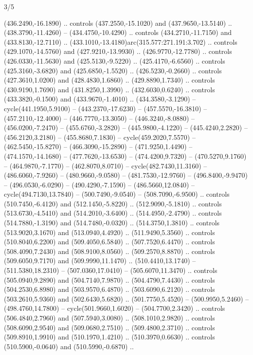 \begin{flagdescription}{3/5}
\begin{scope} [xshift=0.5\flagwidth*\stretchfactor,yshift=0.5\flagwidth,scale=\flagwidth/391]
\begin{scope}[y=0.8pt, x=0.8pt, yscale=-1, xscale=1,line width=0.01\lw,shift={(-98.875,-338.125)}]
\begin{scope}[cm={{0.15382,0.0,0.0,0.15382,(34.72393,273.11413)}}]
  (436.2490,-16.1890) .. controls (437.2550,-15.1020) and (437.9650,-13.5140) ..
  (438.3790,-11.4260) -- (434.4750,-10.4290) .. controls (434.2710,-11.7150) and
  (433.8130,-12.7110) .. (433.1010,-13.4180)arc(315.577:271.191:3.702) ..
  controls (429.1070,-14.5760) and (427.9210,-13.9930) .. (426.9770,-12.7780) ..
  controls (426.0330,-11.5630) and (425.5130,-9.5220) .. (425.4170,-6.6560) ..
  controls (425.3160,-3.6820) and (425.6850,-1.5520) .. (426.5230,-0.2660) ..
  controls (427.3610,1.0200) and (428.4830,1.6860) .. (429.8890,1.7340) ..
  controls (430.9190,1.7690) and (431.8250,1.3990) .. (432.6030,0.6240) ..
  controls (433.3820,-0.1500) and (433.9670,-1.4010) .. (434.3580,-3.1290) --
  cycle(441.1950,5.9100) -- (443.2370,-17.6230) -- (457.5570,-16.3810) --
  (457.2110,-12.4000) -- (446.7770,-13.3050) -- (446.3240,-8.0880) --
  (456.0200,-7.2470) -- (455.6760,-3.2820) -- (445.9800,-4.1220) --
  (445.4240,2.2820) -- (456.2120,3.2180) -- (455.8680,7.1830) --
  cycle(459.2020,7.5570) -- (462.5450,-15.8270) -- (466.3090,-15.2890) --
  (471.9250,1.4490) -- (474.1570,-14.1680) -- (477.7620,-13.6530) --
  (474.4200,9.7320) -- (470.5270,9.1760) -- (464.9870,-7.1770) --
  (462.8070,8.0710) -- cycle(482.7430,11.3160) -- (486.6060,-7.9260) --
  (480.9660,-9.0580) -- (481.7530,-12.9760) -- (496.8400,-9.9470) --
  (496.0530,-6.0290) -- (490.4290,-7.1590) -- (486.5660,12.0840) --
  cycle(494.7130,13.7840) -- (500.7490,-9.0540) -- (508.7090,-6.9500) ..
  controls (510.7450,-6.4120) and (512.1450,-5.8220) .. (512.9090,-5.1810) ..
  controls (513.6730,-4.5410) and (514.2010,-3.6400) .. (514.4950,-2.4790) ..
  controls (514.7880,-1.3190) and (514.7480,-0.0320) .. (514.3750,1.3810) ..
  controls (513.9020,3.1670) and (513.0940,4.4920) .. (511.9490,5.3560) ..
  controls (510.8040,6.2200) and (509.4050,6.5840) .. (507.7520,6.4470) ..
  controls (508.4090,7.2430) and (508.9100,8.0560) .. (509.2570,8.8870) ..
  controls (509.6050,9.7170) and (509.9990,11.1470) .. (510.4410,13.1740) --
  (511.5380,18.2310) -- (507.0360,17.0410) -- (505.6070,11.3470) .. controls
  (505.0940,9.2890) and (504.7140,7.9870) .. (504.4790,7.4430) .. controls
  (504.2530,6.8980) and (503.9570,6.4870) .. (503.6090,6.2120) .. controls
  (503.2610,5.9360) and (502.6430,5.6820) .. (501.7750,5.4520) --
  (500.9950,5.2460) -- (498.4760,14.7800) -- cycle(501.9660,1.6020) --
  (504.7700,2.3420) .. controls (506.4840,2.7960) and (507.5940,3.0080) ..
  (508.1010,2.9820) .. controls (508.6090,2.9540) and (509.0680,2.7510) ..
  (509.4800,2.3710) .. controls (509.8910,1.9910) and (510.1970,1.4210) ..
  (510.3970,0.6630) .. controls (510.5900,-0.0640) and (510.5990,-0.6870) ..

\end{scope}
\end{scope}
\end{scope}
\end{flagdescription}
